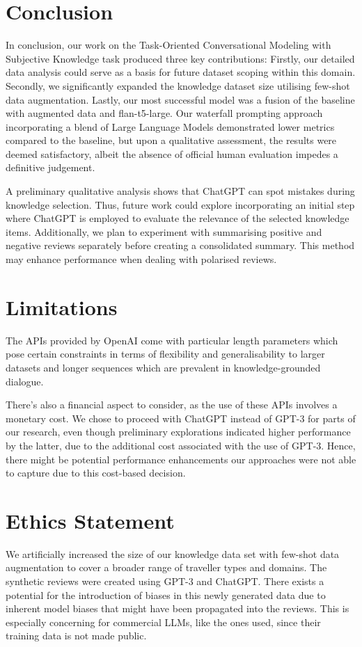 \documentclass[11pt]{article}
\begin{document}
\section{Conclusion}
In conclusion, our work on the Task-Oriented Conversational Modeling with Subjective Knowledge task produced three key contributions: Firstly, our detailed data analysis could serve as a basis for future dataset scoping within this domain. Secondly, we significantly expanded the knowledge dataset size utilising few-shot data augmentation. Lastly, our most successful model was a fusion of the baseline with augmented data and flan-t5-large. Our waterfall prompting approach incorporating a blend of Large Language Models demonstrated lower metrics compared to the baseline, but upon a qualitative assessment, the results were deemed satisfactory, albeit the absence of official human evaluation impedes a definitive judgement.

A preliminary qualitative analysis shows that ChatGPT can spot mistakes during knowledge selection. Thus, future work could explore incorporating an initial step where ChatGPT is employed to evaluate the relevance of the selected knowledge items. Additionally, we plan to experiment with summarising positive and negative reviews separately before creating a consolidated summary. This method may enhance performance when dealing with polarised reviews.

\section*{Limitations}
The APIs provided by OpenAI come with particular length parameters which pose certain constraints in terms of flexibility and generalisability to larger datasets and longer sequences which are prevalent in knowledge-grounded dialogue.

There's also a financial aspect to consider, as the use of these APIs involves a monetary cost. We chose to proceed with ChatGPT instead of GPT-3 for parts of our research, even though preliminary explorations indicated higher performance by the latter, due to the additional cost associated with the use of GPT-3. Hence, there might be potential performance enhancements our approaches were not able to capture due to this cost-based decision.


\section*{Ethics Statement}
We artificially increased the size of our knowledge data set with few-shot data augmentation to cover a broader range of traveller types and domains. The synthetic reviews were created using GPT-3 and ChatGPT. There exists a potential for the introduction of biases in this newly generated data due to inherent model biases that might have been propagated into the reviews. This is especially concerning for commercial LLMs, like the ones used, since their training data is not made public.
\end{document}
